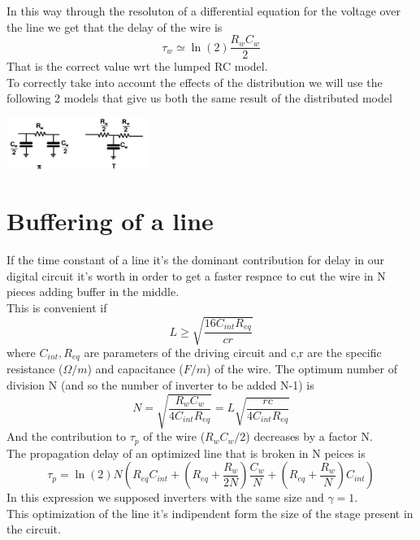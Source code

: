 In this way through the resoluton of a differential equation for the voltage over the line we get that the delay of the wire is 
\begin{equation}
\tau_w\simeq \ln(2)\frac{R_wC_w}{2}
\end{equation}
That is the correct value wrt the lumped RC model.\\

To correctly take into account the effects of the distribution we will use the following 2 models that give us both the same result of the distributed model

\centering
\includegraphics[width=0.35\textwidth]{C5_9.png}\\
\raggedright


\section{Buffering of a line}

If the time constant of a line it's the dominant contribution for delay in our digital circuit it's worth in order to get a faster respnce to cut the wire in N pieces adding buffer in the middle.\\
This is convenient if
\begin{equation}
L\ge\sqrt{\frac{16C_{int}R_{eq}}{cr}}
\end{equation}
where $C_{int},R_{eq}$ are parameters of the driving circuit and c,r are the specific resistance ($\Omega/m$) and capacitance ($F/m$) of the wire.
The optimum number of division N (and so the number of inverter to be added N-1) is
\begin{equation}
N=\sqrt{\frac{R_wC_w}{4C_{int}R_{eq}}}=L\sqrt{\frac{rc}{4C_{int}R_{eq}}}
\end{equation}
And the contribution to $\tau_p$ of the wire ($R_wC_w/2$) decreases by a factor N.\\
The propagation delay of an optimized line that is broken in N peices is 
\begin{equation}
\tau_p=\ln(2) N \left(R_{eq}C_{int}+(R_{eq}+\frac{R_w}{2N})\frac{C_w}{N}+(R_{eq}+\frac{R_w}{N})C_{int}\right)
\end{equation}
In this expression we supposed inverters with the same size and $\gamma=1$.\\
This optimization of the line it's indipendent form the size of the stage present in the circuit.\\

